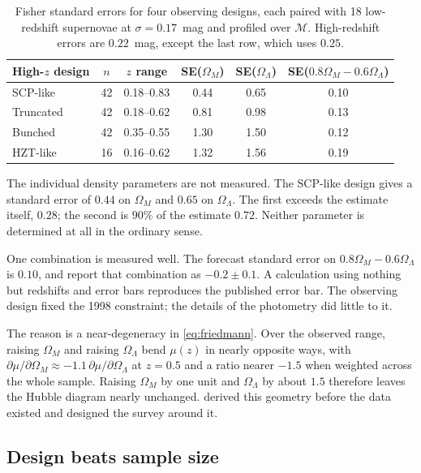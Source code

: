 \documentclass[11pt]{article}
\begin{document}
\begin{table}[ht]
\centering
\caption{Fisher standard errors for four observing designs, each paired with
18 low-redshift supernovae at $\sigma = 0.17$~mag and profiled over
$\mathcal{M}$.  High-redshift errors are $0.22$~mag, except the last row,
which uses $0.25$.}
\label{tab:forecast}
\medskip
\begin{tabular}{lccccc}
\toprule
High-$z$ design & $n$ & $z$ range & SE($\Omega_M$) & SE($\Omega_\Lambda$)
  & SE($0.8\Omega_M - 0.6\Omega_\Lambda$) \\
\midrule
SCP-like  & 42 & 0.18--0.83 & 0.44 & 0.65 & 0.10 \\
Truncated & 42 & 0.18--0.62 & 0.81 & 0.98 & 0.13 \\
Bunched   & 42 & 0.35--0.55 & 1.30 & 1.50 & 0.12 \\
HZT-like  & 16 & 0.16--0.62 & 1.32 & 1.56 & 0.19 \\
\bottomrule
\end{tabular}
\end{table}

The individual density parameters are not measured.  The SCP-like design gives
a standard error of $0.44$ on $\Omega_M$ and $0.65$ on $\Omega_\Lambda$.  The
first exceeds the estimate itself, $0.28$; the second is $90\%$ of the
estimate $0.72$.  Neither parameter is determined at all in the ordinary
sense.

One combination is measured well.  The forecast standard error on
$0.8\Omega_M - 0.6\Omega_\Lambda$ is $0.10$, and \citet{Perlmutter1999} report
that combination as $-0.2 \pm 0.1$.  A calculation using nothing but redshifts
and error bars reproduces the published error bar.  The observing design fixed
the 1998 constraint; the details of the photometry did little to it.

The reason is a near-degeneracy in \eqref{eq:friedmann}.  Over the observed
range, raising $\Omega_M$ and raising $\Omega_\Lambda$ bend $\mu(z)$ in nearly
opposite ways, with $\partial\mu/\partial\Omega_M \approx -1.1\,
\partial\mu/\partial\Omega_\Lambda$ at $z = 0.5$ and a ratio nearer $-1.5$
when weighted across the whole sample.  Raising $\Omega_M$ by one unit and
$\Omega_\Lambda$ by about $1.5$ therefore leaves the Hubble diagram nearly
unchanged.  \citet{GoobarPerlmutter1995} derived this geometry before the data
existed and designed the survey around it.

\subsection*{Design beats sample size}
\end{document}

